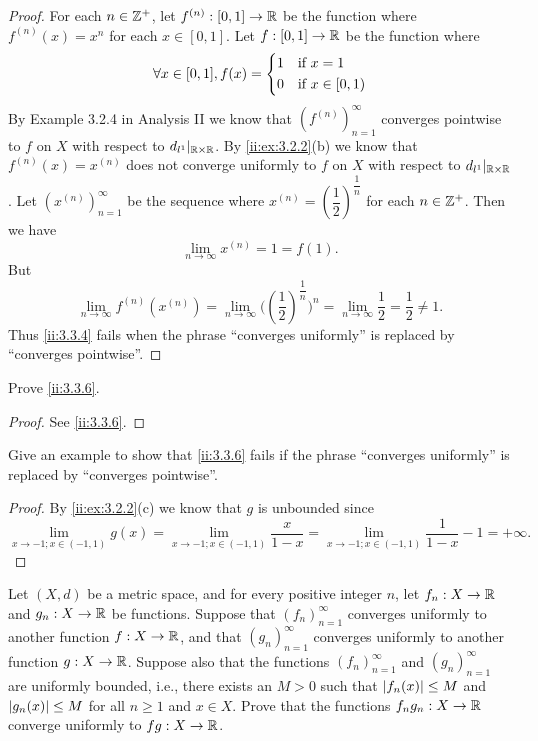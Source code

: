 \begin{proof}
  For each \(n \in \mathbb{Z}^+\), let \(f^{(n)} : [0, 1] \to \mathbb{R}\) be the function where \(f^{(n)}(x) = x^n\) for each \(x \in [0, 1]\).
  Let \(f : [0, 1] \to \mathbb{R}\) be the function where
  \[
    \forall x \in [0, 1], f(x) = \begin{dcases}
      1 & \text{if } x = 1        \\
      0 & \text{if } x \in [0, 1)
    \end{dcases}
  \]
  By Example 3.2.4 in Analysis II we know that \((f^{(n)})_{n = 1}^\infty\) converges pointwise to \(f\) on \(X\) with respect to \(d_{l^1}|_{\mathbb{R} \times \mathbb{R}}\).
  By \cref{ii:ex:3.2.2}(b) we know that \(f^{(n)}(x) = x^{(n)}\) does not converge uniformly to \(f\) on \(X\) with respect to \(d_{l^1}|_{\mathbb{R} \times \mathbb{R}}\).
  Let \((x^{(n)})_{n = 1}^\infty\) be the sequence where \(x^{(n)} = (\dfrac{1}{2})^{\dfrac{1}{n}}\) for each \(n \in \mathbb{Z}^+\).
  Then we have
  \[
    \lim_{n \to \infty} x^{(n)} = 1 = f(1).
  \]
  But
  \[
    \lim_{n \to \infty} f^{(n)}(x^{(n)}) = \lim_{n \to \infty} \big((\dfrac{1}{2})^{\dfrac{1}{n}}\big)^n = \lim_{n \to \infty} \dfrac{1}{2} = \dfrac{1}{2} \neq 1.
  \]
  Thus \cref{ii:3.3.4} fails when the phrase ``converges uniformly'' is replaced by ``converges pointwise''.
\end{proof}

\begin{ex}\label{ii:ex:3.3.6}
  Prove \cref{ii:3.3.6}.
\end{ex}

\begin{proof}
  See \cref{ii:3.3.6}.
\end{proof}

\begin{ex}\label{ii:ex:3.3.7}
  Give an example to show that \cref{ii:3.3.6} fails if the phrase ``converges uniformly'' is replaced by ``converges pointwise''.
\end{ex}

\begin{proof}
  By \cref{ii:ex:3.2.2}(c) we know that \(g\) is unbounded since
  \[
    \lim_{x \to -1 ; x \in (-1, 1)} g(x) = \lim_{x \to -1 ; x \in (-1, 1)} \dfrac{x}{1 - x} = \lim_{x \to -1 ; x \in (-1, 1)} \dfrac{1}{1 - x} - 1 = +\infty.
  \]
\end{proof}

\begin{ex}\label{ii:ex:3.3.8}
  Let \((X, d)\) be a metric space, and for every positive integer \(n\), let \(f_n : X \to \mathbb{R}\) and \(g_n : X \to \mathbb{R}\) be functions.
  Suppose that \((f_n)_{n = 1}^\infty\) converges uniformly to another function \(f : X \to \mathbb{R}\), and that \((g_n)_{n = 1}^\infty\) converges uniformly to another function \(g : X \to \mathbb{R}\).
  Suppose also that the functions \((f_n)_{n = 1}^\infty\) and \((g_n)_{n = 1}^\infty\) are uniformly bounded, i.e., there exists an \(M > 0\) such that \(\left\lvert f_n(x)\right\rvert \leq M\) and \(\left\lvert g_n(x)\right\rvert \leq M\) for all \(n \geq 1\) and \(x \in X\).
  Prove that the functions \(f_n g_n : X \to \mathbb{R}\) converge uniformly to \(fg : X \to \mathbb{R}\).
\end{ex}

